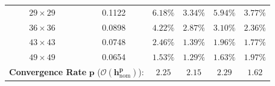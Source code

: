 \documentclass[preprint,12pt]{elsarticle}
\begin{document}
\begin{table}[!t]
{\begin{tabular}{cccccc}
            $29 \times 29$                                                                                    & 0.1122                                    & $6.18\%$                                          & $\mathbf{3.34\%}$                        & $5.94\%$          & $\mathbf{3.77\%}$  \\
            $36 \times 36$                                                                                    & 0.0898                                    & $4.22\%$                                          & $\mathbf{2.87\%}$                        & $3.10\%$          & $\mathbf{2.36\%}$  \\
            $43 \times 43$                                                                                    & 0.0748                                    & $2.46\%$                                          & $\mathbf{1.39\%}$                        & $1.96\%$          & $\mathbf{1.77\%}$  \\
            $49 \times 49$                                                                                    & 0.0654                                    & $1.53\%$                                          & $\mathbf{1.29\%}$                        & $\mathbf{1.63\%}$ & $1.97\%$           \\
            \midrule
            \multicolumn{2}{c}{\textbf{Convergence Rate} $\boldsymbol{p}$ ($\boldsymbol{\mathcal{O}(h_{\mathrm{nom}}^p)}$):} & $\mathbf{2.25}$                           & $\mathbf{2.15}$                                   & $\mathbf{2.29}$                          & $\mathbf{1.62}$                        \\
            \bottomrule
        \end{tabular}
    }
\end{table}
\end{document}

